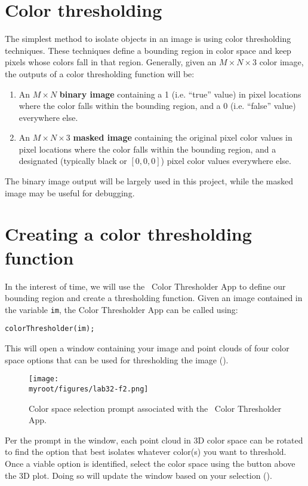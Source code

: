 \documentclass{tufte-handout}
\newcommand{\myroot}{../..}
\begin{document}
\section{Color thresholding}
The simplest method to isolate objects in an image is using color thresholding techniques. These techniques define a bounding region in color space and keep pixels whose colors fall in that region. Generally, given an $M \times N \times 3$ color image, the outputs of a color thresholding function will be:
\begin{enumerate}
\item An $M \times N$ \textbf{binary image} containing a 1 (i.e. ``true'' value) in pixel locations where the color falls within the bounding region, and a 0 (i.e. ``false'' value) everywhere else.
\item An $M \times N \times 3$ \textbf{masked image} containing the original pixel color values in pixel locations where the color falls within the bounding region, and a designated (typically black or $[0,0,0]$) pixel color values everywhere else.
\end{enumerate}
The binary image output will be largely used in this project, while the masked image may be useful for debugging. 

\section{Creating a color thresholding function}
In the interest of time, we will use the \Matlab\ Color Thresholder App to define our bounding region and create a thresholding function. Given an image contained in the variable \lstinline{im}, the Color Thresholder App can be called using:
\begin{lstlisting}[style=usnaMatlab]
colorThresholder(im);
\end{lstlisting}
This will open a window containing your image and point clouds of four color space options that can be used for thresholding the image (). 
\begin{figure}
\begin{center}
\texttt{[image: \\myroot/figures/lab32-f2.png]}
\end{center}
\caption{Color space selection prompt associated with the \Matlab\ Color Thresholder App.}
\label{fig:2}
\end{figure}

Per the prompt in the window, each point cloud in 3D color space can be rotated to find the option that best isolates whatever color(s) you want to threshold. Once a viable option is identified, select the color space using the button above the 3D plot. Doing so will update the window based on your selection (). 
\end{document}
